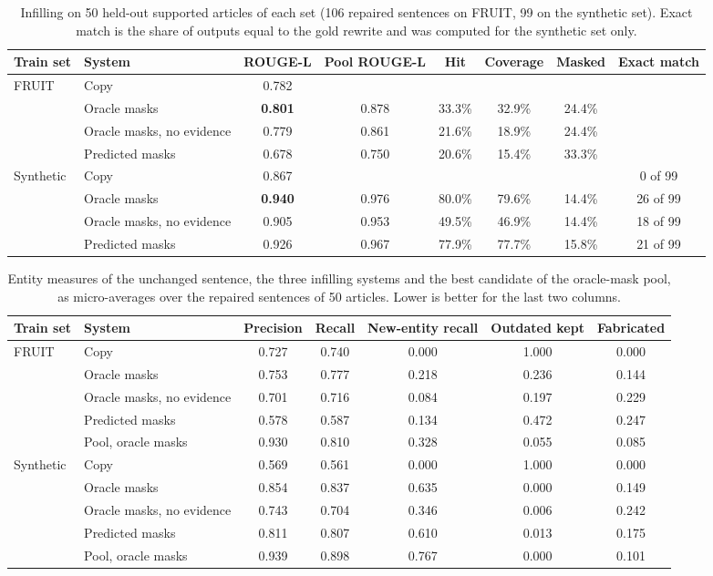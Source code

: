 \documentclass[]{paper}
\begin{document}
\begin{table}[H]
\caption{Infilling on 50 held-out supported articles of each set (106 repaired sentences on FRUIT, 99 on the synthetic set). Exact match is the share of outputs equal to the gold rewrite and was computed for the synthetic set only.}
\label{tab:infilling_full}
\centering
\footnotesize
\setlength{\tabcolsep}{4pt}
\begin{tabular}{llcccccc}
\toprule
Train set & System & ROUGE-L & Pool ROUGE-L & Hit & Coverage & Masked & Exact match \\
\midrule
FRUIT & Copy & 0.782 & & & & & \\
 & Oracle masks & \textbf{0.801} & 0.878 & 33.3\% & 32.9\% & 24.4\% & \\
 & Oracle masks, no evidence & 0.779 & 0.861 & 21.6\% & 18.9\% & 24.4\% & \\
 & Predicted masks & 0.678 & 0.750 & 20.6\% & 15.4\% & 33.3\% & \\
\midrule
Synthetic & Copy & 0.867 & & & & & 0 of 99 \\
 & Oracle masks & \textbf{0.940} & 0.976 & 80.0\% & 79.6\% & 14.4\% & 26 of 99 \\
 & Oracle masks, no evidence & 0.905 & 0.953 & 49.5\% & 46.9\% & 14.4\% & 18 of 99 \\
 & Predicted masks & 0.926 & 0.967 & 77.9\% & 77.7\% & 15.8\% & 21 of 99 \\
\bottomrule
\end{tabular}
\end{table}

\begin{table}[H]
\caption{Entity measures of the unchanged sentence, the three infilling systems and the best candidate of the oracle-mask pool, as micro-averages over the repaired sentences of 50 articles. Lower is better for the last two columns.}
\label{tab:entities}
\centering
\footnotesize
\begin{tabular}{llccccc}
\toprule
Train set & System & Precision & Recall & New-entity recall & Outdated kept & Fabricated \\
\midrule
FRUIT & Copy & 0.727 & 0.740 & 0.000 & 1.000 & 0.000 \\
 & Oracle masks & 0.753 & 0.777 & 0.218 & 0.236 & 0.144 \\
 & Oracle masks, no evidence & 0.701 & 0.716 & 0.084 & 0.197 & 0.229 \\
 & Predicted masks & 0.578 & 0.587 & 0.134 & 0.472 & 0.247 \\
 & Pool, oracle masks & 0.930 & 0.810 & 0.328 & 0.055 & 0.085 \\
\midrule
Synthetic & Copy & 0.569 & 0.561 & 0.000 & 1.000 & 0.000 \\
 & Oracle masks & 0.854 & 0.837 & 0.635 & 0.000 & 0.149 \\
 & Oracle masks, no evidence & 0.743 & 0.704 & 0.346 & 0.006 & 0.242 \\
 & Predicted masks & 0.811 & 0.807 & 0.610 & 0.013 & 0.175 \\
 & Pool, oracle masks & 0.939 & 0.898 & 0.767 & 0.000 & 0.101 \\
\bottomrule
\end{tabular}
\end{table}
\end{document}
